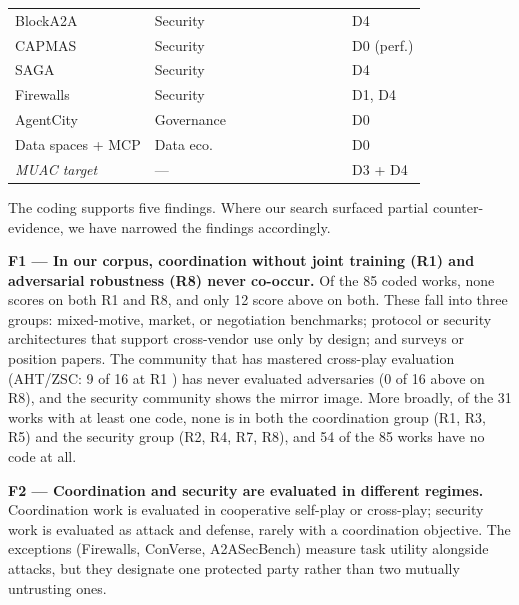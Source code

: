 \documentclass[conference]{IEEEtran}
\newcommand{\full}{{\small\CIRCLE}}
\newcommand{\half}{{\small\LEFTcircle}}
\newcommand{\none}{{\small\Circle}}
\begin{document}
\begin{table}[t]
\begin{tabularx}{\textwidth}{>{\raggedright\arraybackslash}X>{\raggedright\arraybackslash}Xcccccccc>{\raggedright\arraybackslash}X}
BlockA2A \cite{zou2025blocka2a} & Security & \none{} & \half{} & \none{} & \half{} & \none{} & \none{} & \full{} & \full{} & D4 \\
CAPMAS \cite{veski2026capmas} & Security & \none{} & \none{} & \none{} & \full{} & \none{} & \none{} & \full{} & \half{} & D0 (perf.) \\
SAGA \cite{syros2026saga} & Security & \half{} & \half{} & \none{} & \half{} & \none{} & \half{} & \none{} & \full{} & D4 \\
Firewalls \cite{abdelnabi2026firewalls} & Security & \none{} & \none{} & \none{} & \half{} & \none{} & \none{} & \none{} & \full{} & D1, D4 \\
AgentCity \cite{ruan2026agentcity} & Governance & \none{} & \none{} & \none{} & \none{} & \half{} & \half{} & \half{} & \none{} & D0 \\
Data spaces + MCP \cite{alonsoruiz2026bridging} & Data eco. & \half{} & \half{} & \none{} & \none{} & \none{} & \none{} & \none{} & \none{} & D0 \\
\emph{MUAC target} & --- & \full{} & \full{} & \full{} & \full{} & \full{} & \full{} & \full{} & \full{} & D3 + D4 \\
\bottomrule
\end{tabularx}
\end{table}

The coding supports five findings. Where our search surfaced partial counter-evidence, we have narrowed the findings accordingly.

\textbf{F1 --- In our corpus, coordination without joint training (R1) and adversarial robustness (R8) never co-occur.} Of the 85 coded works, none scores \full{} on both R1 and R8, and only 12 score above \none{} on both. These fall into three groups: mixed-motive, market, or negotiation benchmarks; protocol or security architectures that support cross-vendor use only by design; and surveys or position papers. The community that has mastered cross-play evaluation (AHT/ZSC: 9 of 16 at R1 \full{}) has never evaluated adversaries (0 of 16 above \none{} on R8), and the security community shows the mirror image. More broadly, of the 31 works with at least one \full{} code, none is \full{} in both the coordination group (R1, R3, R5) and the security group (R2, R4, R7, R8), and 54 of the 85 works have no \full{} code at all.

\textbf{F2 --- Coordination and security are evaluated in different regimes.} Coordination work is evaluated in cooperative self-play or cross-play; security work is evaluated as attack and defense, rarely with a coordination objective. The exceptions (Firewalls, ConVerse, A2ASecBench) measure task utility alongside attacks, but they designate one protected party rather than two mutually untrusting ones.
\end{document}
